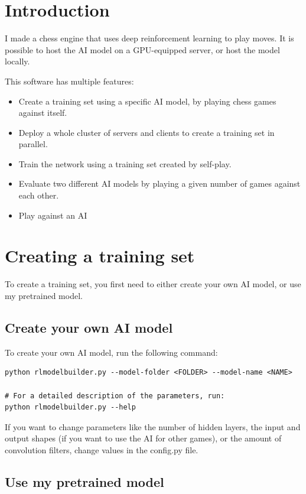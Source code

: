 \documentclass{article}
\begin{document}
\section{Introduction}

I made a chess engine that uses deep reinforcement learning to 
play moves. It is possible to host the AI model on a GPU-equipped server, or
host the model locally.

This software has multiple features:

\begin{itemize}
	\item Create a training set using a specific AI model, by playing chess games against itself.
	\item Deploy a whole cluster of servers and clients to create a training set in parallel.
	\item Train the network using a training set created by self-play.
	\item Evaluate two different AI models by playing a given number of games against each other.
	\item Play against an AI
\end{itemize}


\section{Creating a training set}

To create a training set, you first need to either create your own AI model, or use my pretrained model.

\subsection{Create your own AI model}

To create your own AI model, run the following command:

\begin{verbatim}
python rlmodelbuilder.py --model-folder <FOLDER> --model-name <NAME> 

# For a detailed description of the parameters, run:
python rlmodelbuilder.py --help
\end{verbatim}

If you want to change parameters like the number of hidden layers, 
the input and output shapes (if you want to use the AI for other games), or the amount of convolution filters, 
change values in the config.py file.

\subsection{Use my pretrained model}
\end{document}
